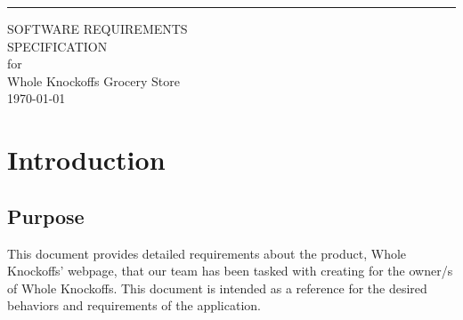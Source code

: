 \documentclass{scrreprt}
\date{}
\theoremstyle{funreq}
\def\myversion{1.0 }
\begin{document}
\begin{flushright}
    \rule{16cm}{5pt}\vskip1cm
    \begin{bfseries}
        \Huge{SOFTWARE REQUIREMENTS\\ SPECIFICATION}\\
        \vspace{1.9cm}
        for\\
        \vspace{1.9cm}
        Whole Knockoffs Grocery Store\\
        \vspace{1.9cm}
        \today\\
    \end{bfseries}
\end{flushright}

\tableofcontents


%

\chapter{Introduction}

\section{Purpose}
This document provides detailed requirements about the product, Whole Knockoffs' webpage, that our team has been tasked with creating for the owner/s of Whole Knockoffs.  This document is intended as a reference for the desired behaviors and requirements of the application.
\end{document}
